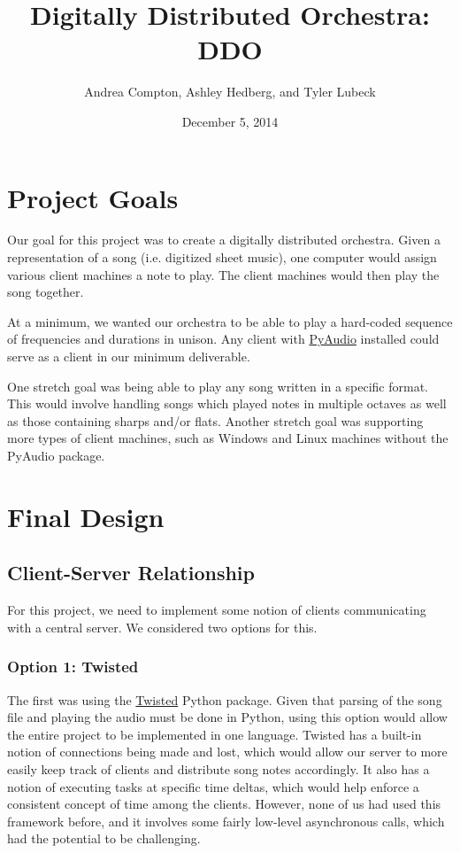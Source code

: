 \documentclass[12pt, letterpaper]{article}
\begin{document}
\title{Digitally Distributed Orchestra: DDO}
\author{Andrea Compton, Ashley Hedberg, and Tyler Lubeck}
\date{December 5, 2014}
\maketitle

\setcounter{tocdepth}{2}
\tableofcontents

\section{Project Goals}
Our goal for this project was to create a digitally distributed orchestra. Given a representation of
a song (i.e. digitized sheet music), one computer would assign various client machines a note to
play. The client machines would then play the song together.

At a minimum, we wanted our orchestra to be able to play a hard-coded sequence of frequencies and
durations in unison. Any client with \href{http://people.csail.mit.edu/hubert/pyaudio/}{PyAudio}
installed could serve as a client in our minimum deliverable.

One stretch goal was being able to play any song written in a specific format. This would involve
handling songs which played notes in multiple octaves as well as those containing sharps and/or
flats. Another stretch goal was supporting more types of client machines, such as Windows and Linux
machines without the PyAudio package. 

\section{Final Design}

\subsection{Client-Server Relationship}
For this project, we need to implement some notion of clients communicating with a central server.
We considered two options for this.
            
\subsubsection{Option 1: Twisted}
The first was using the \href{https://twistedmatrix.com/}{Twisted} Python package. Given that
parsing of the song file and playing the audio must be done in Python, using this option would allow
the entire project to be implemented in one language. Twisted has a built-in notion of connections
being made and lost, which would allow our server to more easily keep track of clients and
distribute song notes accordingly. It also has a notion of executing tasks at specific time deltas,
which would help enforce a consistent concept of time among the clients. However, none of us had
used this framework before, and it involves some fairly low-level asynchronous calls, which had the
potential to be challenging.
            
\end{document}
